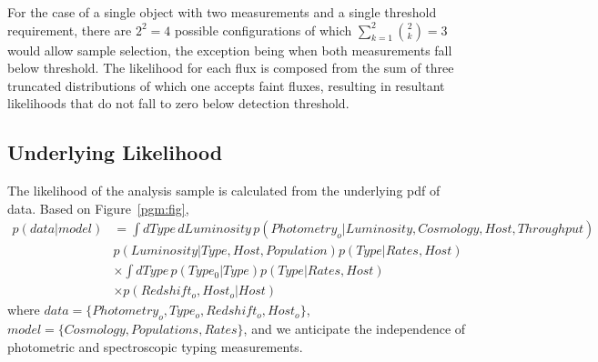 \documentclass[preprint,3p]{elsarticle}
\begin{document}
For the case of a single object with two measurements and a single threshold requirement,
there are $2^2=4$ possible configurations of which $\sum_{k=1}^{2} \binom{2}{k}=3$
would allow sample selection, the exception being when both measurements fall below threshold.
The likelihood for each flux is composed from
the sum of three truncated distributions of which one accepts faint fluxes,
resulting in resultant likelihoods that do not fall to zero below detection threshold.

\subsection{Underlying Likelihood}
The likelihood of the analysis sample is calculated from the underlying pdf of data.  Based on Figure~\ref{pgm:fig},
\begin{align}
p(data|model) &=\int dType\, dLuminosity\, p(Photometry_o |  Luminosity, Cosmology,Host,Throughput)  \nonumber\\
& p(Luminosity| Type
, Host, Population) p(Type | Rates, Host)  \nonumber\\
& \times \int dType\, p(Type_0|Type) p(Type|Rates, Host) \nonumber \\
& \times p(Redshift_o, Host_o| Host)
\label{like:eqn}
\end{align}
where $data=\{Photometry_o, Type_o, Redshift_o, Host_o\}$,
$model=\{Cosmology, Populations, Rates\}$, and we anticipate the independence
of photometric and spectroscopic typing measurements.
\end{document}
